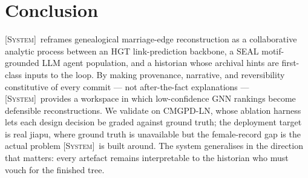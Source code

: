 \documentclass[review]{vgtc}                  %
\newcommand{\system}{\textsc{[System]}\xspace}
\begin{document}
\section{Conclusion}
\label{sec:conclusion}

\system\ reframes genealogical marriage-edge reconstruction as a
collaborative analytic process between an HGT link-prediction
backbone, a SEAL motif-grounded LLM agent population, and a historian
whose archival hints are first-class inputs to the loop. By making
provenance, narrative, and reversibility constitutive of every commit
--- not after-the-fact explanations --- \system\ provides a workspace
in which low-confidence GNN rankings become defensible reconstructions.
We validate on CMGPD-LN, whose ablation harness lets each design
decision be graded against ground truth; the deployment target is
real jiapu, where ground truth is unavailable but the female-record
gap is the actual problem \system\ is built around. The system
generalises in the direction that matters: every artefact remains
interpretable to the historian who must vouch for the finished tree.




\end{document}
